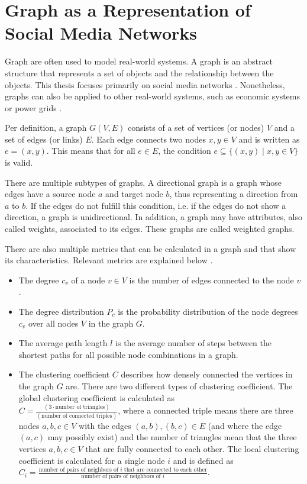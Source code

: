 \section{Graph as a Representation of Social Media Networks}
\label{graphbasics}
Graph are often used to model real-world systems.
A graph is an abstract structure that represents a set of objects and the 
relationship between the objects. 
This thesis focuses primarily on social media networks
\cite{socialgraphexample}. Nonetheless, graphs can 
also be applied to other real-world systems, such as economic systems 
\cite{economicsgraph} or power grids \cite{powergraphexample}.


Per definition, a graph $G(V, E)$ consists of a set of vertices (or nodes) $V$ and a 
set of edges (or links) $E$. Each edge connects two nodes $x, y \in V$ and is 
written as $e=(x, y)$. This means that for all $e\in E$, the 
condition  $e \subseteq\{ (x, y) \mid x, y \in V  \}$ 
is valid.

There are multiple subtypes of graphs. A directional graph is a graph 
whose edges have a source node $a$ and target node $b$, thus representing
a direction from $a$ to $b$. If the edges do not fulfill this 
condition, i.e. if the edges do not show a direction, a graph is unidirectional.
In addition, a graph may have attributes, also called weights, 
associated to its edges. These graphs are called weighted graphs.

There are also multiple metrics that can be calculated in a graph
and that show its characteristics. Relevant metrics are 
explained below \cite{basicnetwork}.
\begin{itemize}
    \item The degree $c_v$ of a node $v \in V$ is the number of edges connected to the
    node $v$. 
    \item The degree distribution $P_c$ is the probability distribution 
    of the node degrees $c_v$ over all nodes $V$ in the graph $G$. 
    \item The average path length $l$ is the average number of steps between
    the shortest paths for all possible node combinations in a graph.
    \item The clustering coefficient $C$ describes how densely connected
    the vertices in the graph $G$ are. There are two different types of
    clustering coefficient. The global clustering
    coefficient is calculated as \\
    $C=\frac{(3 \cdot\text{number of triangles})}{(\text{number of connected triples})}$,
    where a connected triple means there are three nodes $a,b,c\in V$ with
    the edges $(a,b), (b,c) \in E$ (and where the edge $(a,c)$ may 
    possibly exist) and the number of triangles mean
    that the three vertices $a,b,c\in V$ that are fully connected to each other.
    The local clustering coefficient is calculated for a single node $i$
    and is defined as $C_i=\frac{\text{number of pairs of neighbors of }i 
    \text{ that are connected to each other}}
    {\text{number of pairs of neighbors of }i }$.
\end{itemize}

